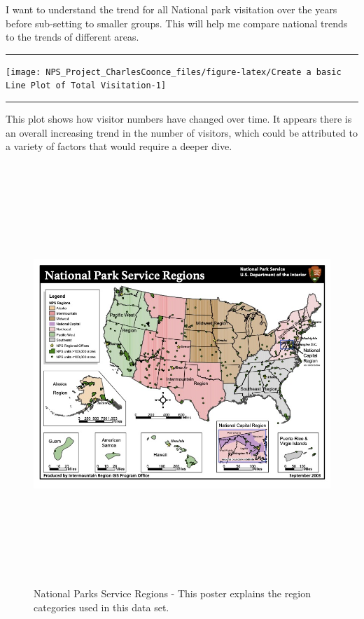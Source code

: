 \documentclass[
]{article}
\begin{document}
I want to understand the trend for all National park visitation over the
years before sub-setting to smaller groups. This will help me compare
national trends to the trends of different areas.

\begin{center}\rule{0.5\linewidth}{0.5pt}\end{center}

\texttt{[image: NPS\_Project\_CharlesCoonce\_files/figure-latex/Create a basic Line Plot of Total Visitation-1]}

\begin{center}\rule{0.5\linewidth}{0.5pt}\end{center}

This plot shows how visitor numbers have changed over time. It appears
there is an overall increasing trend in the number of visitors, which
could be attributed to a variety of factors that would require a deeper
dive.

\begin{figure}
\centering
\includegraphics[width=5.20833in,height=6.25in]{assets/nps_regions_map.jpg}
\caption{National Parks Service Regions - This poster explains the
region categories used in this data set.}
\end{figure}
\end{document}
